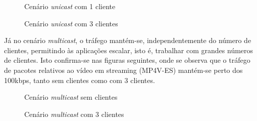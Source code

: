 \documentclass[a4paper, 11pt]{article}
\begin{document}
\begin{figure}[H]
    \centering
    \caption{Cenário \textit{unicast} com 1 cliente}
\end{figure}

\begin{figure}[H]
    \centering
    \caption{Cenário \textit{unicast} com 3 clientes}
\end{figure}

Já no cenário \textit{multicast}, o tráfego mantém-se, independentemente do número de clientes, permitindo às aplicações escalar, isto é, trabalhar com grandes números de clientes. Isto confirma-se nas figuras seguintes, onde se observa que o tráfego de pacotes relativos ao vídeo em streaming (MP4V-ES) mantém-se perto dos 100kbps, tanto sem clientes como com 3 clientes.

\begin{figure}[H]
    \centering
    \caption{Cenário \textit{multicast} sem clientes}
\end{figure}

\begin{figure}[H]
    \centering
    \caption{Cenário \textit{multicast} com 3 clientes}
\end{figure}
\end{document}
